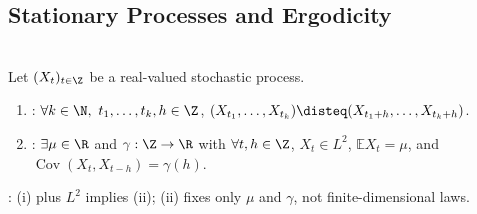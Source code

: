 \subsection{Stationary Processes and Ergodicity}

\begin{definition} \label{def:strict-and-weak-stationarity} \\
Let $(X_t)_{t\in\Z}$ be a real-valued stochastic process.
\begin{enumerate}[label=(\roman*)]
\setlength{\itemsep}{0pt}
\item {}: $\forall k\in\N,\ t_1,\ldots,t_k,h\in\Z$, $(X_{t_1},\ldots,X_{t_k})\disteq(X_{t_1+h},\ldots,X_{t_k+h})$.
\item {}: $\exists\mu\in\R$ and $\gamma:\Z\to\R$ with $\forall t,h\in\Z$, $X_t\in L^2$, $\mathbb{E}X_t=\mu$, and $\operatorname{Cov}(X_t,X_{t-h})=\gamma(h)$.
\end{enumerate}
: (i) plus $L^2$ implies (ii); (ii) fixes only $\mu$ and $\gamma$, not finite-dimensional laws.
\end{definition}
